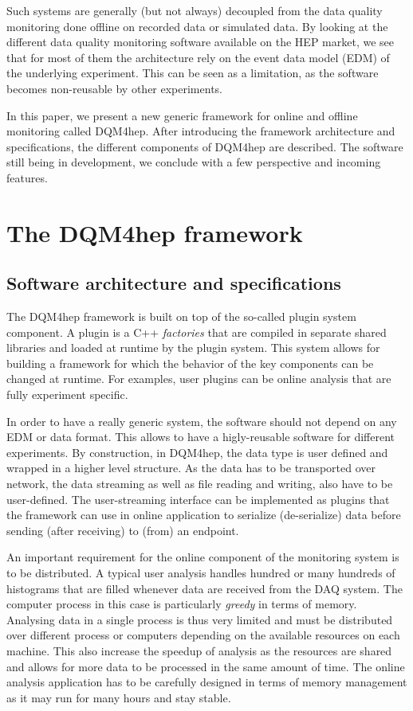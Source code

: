 \documentclass{webofc}
\begin{document}
Such systems are generally (but not always) decoupled from the data quality monitoring done offline on recorded data or simulated data. By looking at the different data quality monitoring software available on the HEP market, we see that for most of them the architecture rely on the event data model (EDM) of the underlying experiment. This can be seen as a limitation, as the software becomes non-reusable by other experiments.

In this paper, we present a new generic framework for online and offline monitoring called DQM4hep. After introducing the framework architecture and specifications, the different components of DQM4hep are described. The software still being in development, we conclude with a few perspective and incoming features.

\section{The DQM4hep framework}
\label{sec:framework}

\subsection{Software architecture and specifications}
\label{subsec:arch}

The DQM4hep framework is built on top of the so-called plugin system component. A plugin is a C++ \textit{factories} that are compiled in separate shared libraries and loaded at runtime by the plugin system. This system allows for building a framework for which the behavior of the key components can be changed at runtime. For examples, user plugins can be online analysis that are fully experiment specific.

In order to have a really generic system, the software should not depend on any EDM or data format. This allows to have a higly-reusable software for different experiments. By construction, in DQM4hep, the data type is user defined and wrapped in a higher level structure. As the data has to be transported over network, the data streaming as well as file reading and writing, also have to be user-defined. The user-streaming interface can be implemented as plugins that the framework can use in online application to serialize (de-serialize) data before sending (after receiving) to (from) an endpoint.

An important requirement for the online component of the monitoring system is to be distributed. A typical user analysis handles hundred or many hundreds of histograms that are filled whenever data are received from the DAQ system. The computer process in this case is particularly \textit{greedy} in terms of memory. Analysing data in a single process is thus very limited and must be distributed over different process or computers depending on the available resources on each machine. This also increase the speedup of analysis as the resources are shared and allows for more data to be processed in the same amount of time. The online analysis application has to be carefully designed in terms of memory management as it may run for many hours and stay stable.
\end{document}
